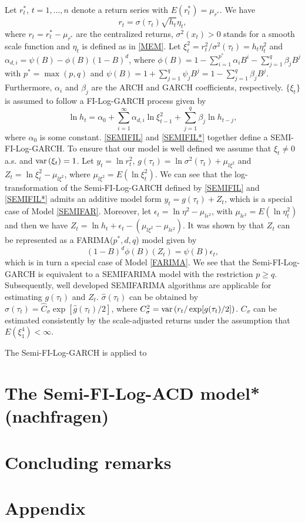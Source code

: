 \documentclass[12pt]{article}
\newcommand{\var}{\mbox{var\,}}
\begin{document}
Let $r^*_t$, $t = 1,...,n$ denote a return series with $E(r^*_t) = \mu_{r^*}$. We have
\begin{equation}
	\label{SEMIFIL}
	r_t=\sigma(\tau_t) \sqrt{h_t} \eta_t,
\end{equation}
where $r_t = r_t^* - \mu_{r^*}$ are the centralized returns, $\sigma^2(x_t) >0$ stands for a smooth scale function and $\eta_t$ is defined as in \eqref{MEM}. Let $\xi_t^2=r_t^2 / \sigma^2(\tau_t)=h_t \eta_t^2$ and  $\alpha_{d,i} = \psi(B) - \phi(B)(1-B)^d$, where $\phi(B) = 1 - \sum_{i = 1}^{p^*}\alpha_i B^i - \sum_{j = 1}^{q}\beta_jB^j$ with $p^* = \max(p,q)$ and $\psi(B) = 1 + \sum_{j=1}^{q}\psi_jB^j = 1 - \sum_{j = 1}^{q}\beta_jB^j$. Furthermore, $\alpha_i$ and $\beta_j$ are the ARCH and GARCH coefficients, respectively. $\{\xi_t\}$ is assumed to follow a FI-Log-GARCH process given by 
\begin{equation}
	\label{SEMIFIL*}
	\ln h_t = \alpha_0 + \sum_{i = 1}^{\infty}\alpha_{d,i} \ln \xi_{t-1}^2 + \sum_{j = 1}^{q} \beta_j \ln h_{t-j},	
\end{equation}
where $\alpha_0$ is some constant. \eqref{SEMIFIL} and \eqref{SEMIFIL*} together define a SEMI-FI-Log-GARCH. To ensure that our model is well defined we assume that $\xi_t \neq 0$ a.s. and $\var(\xi_t) = 1$. Let $y_t = \ln r^2_t$, $g(\tau_t) = \ln \sigma^2(\tau_t) + \mu_{l\xi^2}$ and $Z_t = \ln \xi^2_t - \mu_{l\xi^2}$, where $\mu_{l\xi^2} = E(\ln \xi_t^2)$. 
We can see that the log-transformation of the Semi-FI-Log-GARCH defined by \eqref{SEMIFIL} and \eqref{SEMIFIL*}  admits an additive model form $y_t = g(\tau_t) + Z_t$, which is a special case of Model \eqref{SEMIFAR}. Moreover, let $\epsilon_t = \ln \eta^2 - \mu_{l\epsilon^2}$, with $\mu_{l\epsilon^2} = E(\ln \eta^2_t)$ and then we have $Z_t = \ln h_t + \epsilon_t - (\mu_{l\xi^2} - \mu_{l\epsilon^2})$. It was shown by \citet{feng2020fractionally} that $Z_t$ can be represented as a FARIMA($p^*,d,q$) model given by 
\begin{equation}
	(1-B)^d\phi(B)(Z_t) = \psi(B)\epsilon_t,	
\end{equation}
which is in turn a special case of Model \eqref{FARIMA}. We see that the Semi-FI-Log-GARCH is equivalent to a SEMIFARIMA model with the restriction $p \geq q$. Subsequently, well developed SEMIFARIMA algorithms are applicable for estimating $g(\tau_t)$ and $Z_t$. %
$\hat{\sigma}(\tau_t)$ can be obtained by $\hat{\sigma}(\tau_t) = \hat{C}_\sigma \exp [\hat{g}(\tau_t) / 2]$, where $C_\sigma^2 = \var (r_t / \exp[g(\tau_t) / 2])$. $C_\sigma$ can be estimated consistently by the scale-adjusted returns under the assumption that $E(\xi_1^4)<\infty$.

The Semi-FI-Log-GARCH is applied to 


\section{The Semi-FI-Log-ACD model* (nachfragen)}

\section{Concluding remarks}

\printbibliography

\section*{Appendix}
\end{document}
